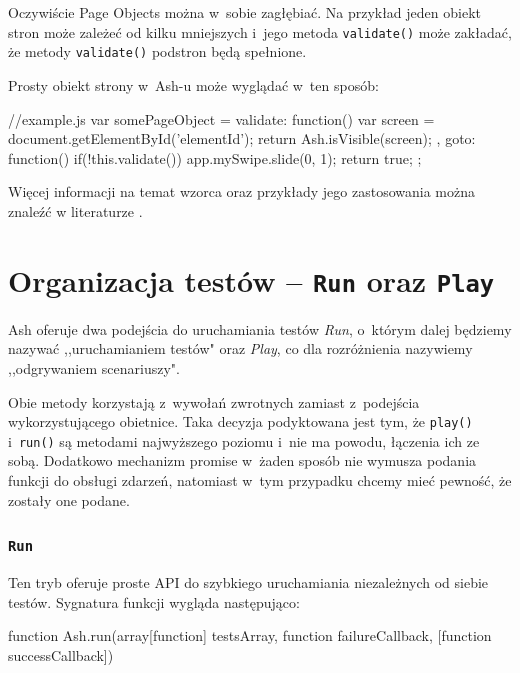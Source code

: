 \documentclass[brudnopis]{xmgr}
\begin{document}
Oczywiście Page Objects można w~sobie zagłębiać. Na przykład jeden obiekt stron może zależeć od kilku mniejszych i~jego metoda \texttt{validate()} może zakładać, że metody \texttt{validate()} podstron będą spełnione. 

Prosty obiekt strony w~Ash-u może wyglądać w~ten sposób:

\begin{javascriptcode}
    //example.js
    var somePageObject = {
    	validate: function(){
      	    var screen = document.getElementById('elementId');
             return Ash.isVisible(screen);
          },
         goto: function(){
             if(!this.validate()) app.mySwipe.slide(0, 1);
             return true;
         }
    };
\end{javascriptcode}

Więcej informacji na temat wzorca oraz przykłady jego zastosowania można znaleźć w literaturze \cite{Selenium}.

\section{Organizacja testów -- \texttt{Run} oraz \texttt{Play}}

Ash oferuje dwa podejścia do uruchamiania testów \textit{Run}, o~którym dalej będziemy nazywać ,,uruchamianiem testów" oraz \textit{Play}, co dla rozróżnienia nazywiemy ,,odgrywaniem scenariuszy".

Obie metody korzystają z~wywołań zwrotnych zamiast z~podejścia wykorzystującego obietnice. Taka decyzja podyktowana jest tym, że \texttt{play()} i~\texttt{run()} są metodami najwyższego poziomu i~nie ma powodu, łączenia ich ze sobą. Dodatkowo mechanizm promise w~żaden sposób nie wymusza podania funkcji do obsługi zdarzeń, natomiast w~tym przypadku chcemy mieć pewność, że zostały one podane.  

\subsubsection{\texttt{Run} }

Ten tryb oferuje proste API do szybkiego uruchamiania niezależnych od siebie testów. Sygnatura funkcji wygląda następująco: 

\begin{javascriptcode}
  function Ash.run(array[function] testsArray, 
                   function failureCallback, 
                   [function successCallback]) 
\end{javascriptcode}
\end{document}
